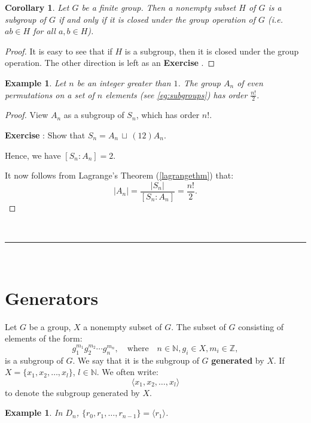 \documentclass[a4paper,12pt]{report}
\newcommand{\abs}[1]{\left|#1\right|}
\newcounter{statement}
\numberwithin{statement}{chapter}
\newtheorem{cor}[statement]{Corollary}
\newtheorem{eg}[statement]{\bf Example}
\numberwithin{equation}{chapter}
\numberwithin{section}{chapter}
\numberwithin{subsection}{section}
\begin{document}
\begin{cor}
Let $G$ be a  finite group. Then a nonempty subset $H$ of $G$
is a subgroup of $G$ if and only if it is closed under the group operation of $G$
(i.e. $ab \in H$ for all $a, b \in H$).
\end{cor}
\begin{proof}

It is easy to see that if $H$ is a subgroup,
then it is closed under the group operation.
The other direction is left as an  {\bf Exercise} .
\end{proof}

\begin{eg}
Let $n$ be an integer greater than $1$. The group $A_n$ of even permutations
on a set of $n$ elements (see \cref{eg:subgroups}) has order $\displaystyle \frac{n!}{2}$.
\end{eg}
\begin{proof}

View $A_n$ as a subgroup of $S_n$, which has order $n!$.



 {\bf Exercise} : Show that $S_n = A_n\, \sqcup\, (12)A_n$.




Hence, we have $[S_n: A_n] = 2$.




It now follows from Lagrange's Theorem (\cref{lagrangethm}) that:
\[\abs{A_n} = \frac{\abs{S_n}}{[S_n: A_n]} = \frac{n!}{2}.\]
\end{proof}

\quad\\\hrule
\quad\\
\section*{Generators}

Let $G$ be a group, $X$ a nonempty subset of $G$.
The subset of $G$ consisting of elements of the form:
\[g_1^{m_1}g_2^{m_2}\cdots g_n^{m_n},
\quad\text{where}\quad
n \in \mathbb{N}, g_i \in X, m_i \in \mathbb{Z},\]
is a subgroup of $G$.
We say that it is the subgroup of $G$  {\bf generated}  by $X$.
If $X = \{x_1, x_2, \ldots, x_l\}$, $l \in \mathbb{N}$.
We often write:
\[\langle x_1, x_2, \ldots, x_l\rangle\]
to denote the subgroup generated by $X$.
\begin{eg}

In $D_n$, $\{ r_0, r_1, \ldots, r_{n - 1}\} = \langle r_1 \rangle$.
\end{eg}
\end{document}
